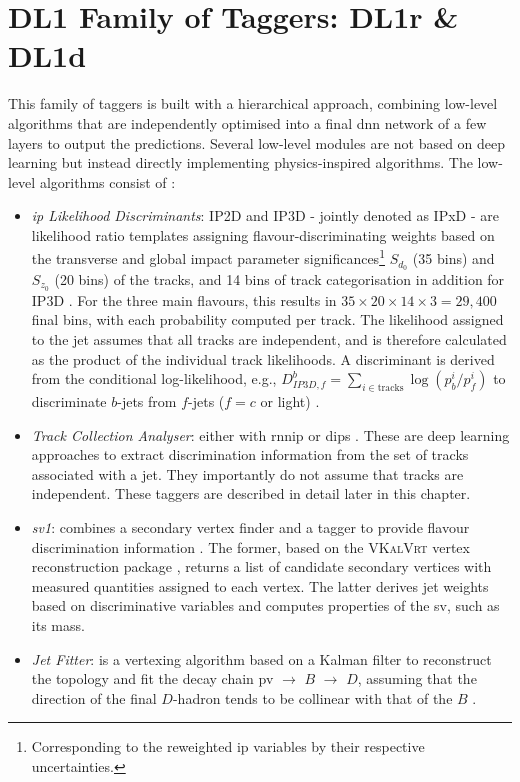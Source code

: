 \section{DL1 Family of Taggers: DL1r \& DL1d}
This family of taggers is built with a hierarchical approach, combining low-level algorithms that are independently optimised into a final \gls{dnn} network of a few layers to output the predictions. Several low-level modules are not based on deep learning but instead directly implementing physics-inspired algorithms. The low-level algorithms consist of \cite{atlas:FTAGRUN2, Paganini:2289214}:
\begin{itemize}
  \item \textit{\gls{ip} Likelihood Discriminants}: IP2D and IP3D - jointly denoted as IPxD - are likelihood ratio templates assigning flavour-discriminating weights based on the transverse and global impact parameter significances\footnote{Corresponding to the reweighted \gls{ip} variables by their respective uncertainties.} $S_{d_0}$ (35 bins) and $S_{z_0}$ (20 bins) of the tracks, and 14 bins of track categorisation in addition for IP3D \cite{ATLAS:2017bcq}. For the three main flavours, this results in $35 \times 20 \times 14 \times 3 = 29,400$ final bins, with each probability computed per track. The likelihood assigned to the jet assumes that all tracks are independent, and is therefore calculated as the product of the individual track likelihoods. A discriminant is derived from the conditional log-likelihood, e.g., $D^b_{IP3D,f} = \sum_{i \in \textrm{tracks}} \log (p_b^i / p_f^i)$ to discriminate $b$-jets from $f$-jets ($f= c$ or light) \cite{ATL-PHYS-PUB-2015-022}.
  \item \textit{Track Collection Analyser}: either with \gls{rnnip} \cite{ATL-PHYS-PUB-2017-003} or \gls{dips} \cite{ATL-PHYS-PUB-2020-014}. These are deep learning approaches to extract discrimination information from the set of tracks associated with a jet. They importantly do not assume that tracks are independent. These taggers are described in detail later in this chapter. 
  \item \textit{\gls{sv1}}: combines a secondary vertex finder and a tagger to provide flavour discrimination information \cite{atlas:FTAGRUN2}. The former, based on the \textsc{VKalVrt} vertex reconstruction package \cite{Kostyukhin:685551}, returns a list of candidate secondary vertices with measured quantities assigned to each vertex. The latter derives jet weights based on discriminative variables and computes properties of the \gls{sv}, such as its mass. 
  \item \textit{Jet Fitter}: is a vertexing algorithm based on a Kalman filter to reconstruct the topology and fit the decay chain \gls{pv} $\rightarrow$ $B$ $\rightarrow$ $D$, assuming that the direction of the final $D$-hadron tends to be collinear with that of the $B$ \cite{atlas:FTAGRUN2, ATL-PHYS-PUB-2018-025}. 
\end{itemize}

